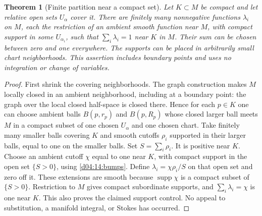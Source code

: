 \documentclass[11pt,oneside,openany]{book}
\newtheorem{theorem}{Theorem}[chapter]
\theoremstyle{definition}
\theoremstyle{remark}
\DeclareMathOperator{\supp}{supp}
\begin{document}
\begin{theorem}[Finite partition near a compact set]\label{d04:14:partition}
Let $K\subset M$ be compact and let relative open sets $U_\alpha$ cover it.
There are finitely many nonnegative functions $\lambda_i$ on $M$, each the
restriction of an ambient smooth function near $M$, with compact support
in some $U_{\alpha_i}$, such that $\sum_i\lambda_i=1$ near $K$ in $M$.
Their sum can be chosen between zero and one everywhere. The supports can
be placed in arbitrarily small chart neighborhoods. This assertion includes
boundary points and uses no integration or change of variables.
\end{theorem}
\begin{proof}
First shrink the covering neighborhoods. The graph construction makes $M$
locally closed in an ambient neighborhood, including at a boundary point:
the graph over the local closed half-space is closed there. Hence for each
$p\in K$ one can choose ambient balls $B(p,r_p)$ and $B(p,R_p)$ whose
closed larger ball meets $M$ in a compact subset of one chosen $U_\alpha$
and one chosen chart. Take finitely many smaller balls covering $K$ and
smooth cutoffs $\rho_i$ supported in their larger balls, equal to one on
the smaller balls. Set $S=\sum_i\rho_i$. It is positive near $K$.
Choose an ambient cutoff $\chi$ equal to one near $K$, with compact support
in the open set $\{S>0\}$, using \cref{d04:14:bumps}.
Define $\lambda_i=\chi\rho_i/S$ on that open set and zero off it.
These extensions are smooth because $\supp\chi$ is a compact subset of
$\{S>0\}$. Restriction to $M$ gives compact subordinate supports, and
$\sum_i\lambda_i=\chi$ is one near $K$. This also proves the claimed
support control. No appeal to substitution, a manifold integral, or Stokes
has occurred.
\end{proof}
\end{document}
